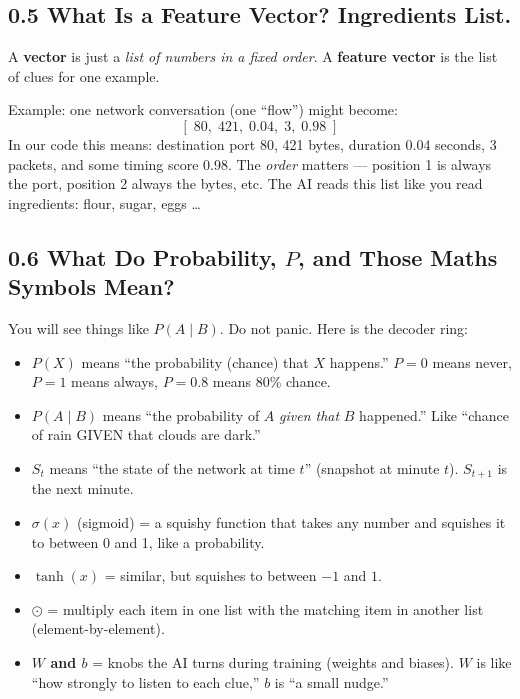 \documentclass[11pt,a4paper]{article}
\begin{document}
\subsection{0.5 What Is a Feature Vector? Ingredients List.}

A \textbf{vector} is just a \emph{list of numbers in a fixed order}. A
\textbf{feature vector} is the list of clues for one example.

Example: one network conversation (one ``flow'') might become:
\[
[\; 80,\;  421,\;  0.04,\;  3,\;  0.98\;]
\]
In our code this means: destination port 80, 421 bytes, duration 0.04 seconds,
3 packets, and some timing score 0.98. The \emph{order} matters --- position 1
is always the port, position 2 always the bytes, etc. The AI reads this list
like you read ingredients: flour, sugar, eggs \dots

\subsection{0.6 What Do Probability, $P$, and Those Maths Symbols Mean?}

You will see things like $P(A \mid B)$. Do not panic. Here is the decoder ring:

\begin{itemize}[leftmargin=1.6em,itemsep=2pt]
  \item \textbf{$P(X)$} means ``the probability (chance) that $X$ happens.''
        $P=0$ means never, $P=1$ means always, $P=0.8$ means 80\% chance.
  \item \textbf{$P(A \mid B)$} means ``the probability of $A$ \emph{given that}
        $B$ happened.'' Like ``chance of rain GIVEN that clouds are dark.''
  \item \textbf{$S_t$} means ``the state of the network at time $t$'' (snapshot
        at minute $t$). $S_{t+1}$ is the next minute.
  \item \textbf{$\sigma(x)$} (sigmoid) = a squishy function that takes any
        number and squishes it to between 0 and 1, like a probability.
  \item \textbf{$\tanh(x)$} = similar, but squishes to between $-1$ and $1$.
  \item \textbf{$\odot$} = multiply each item in one list with the matching
        item in another list (element-by-element).
  \item \textbf{$W$ and $b$} = knobs the AI turns during training (weights and
        biases). $W$ is like ``how strongly to listen to each clue,'' $b$ is
        ``a small nudge.''
\end{itemize}
\end{document}
